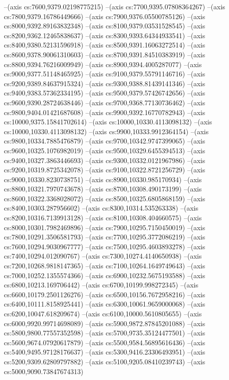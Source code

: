 --(axis cs:7600,9379.02198775215)
--(axis cs:7700,9395.07808364267)
--(axis cs:7800,9379.16786449666)
--(axis cs:7900,9376.05500785126)
--(axis cs:8000,9392.89163832348)
--(axis cs:8100,9379.03531528545)
--(axis cs:8200,9362.12465838637)
--(axis cs:8300,9393.64344933541)
--(axis cs:8400,9380.52131596918)
--(axis cs:8500,9391.16063272514)
--(axis cs:8600,9378.90061310603)
--(axis cs:8700,9391.84510383919)
--(axis cs:8800,9394.76216009949)
--(axis cs:8900,9394.4005287077)
--(axis cs:9000,9377.51148465925)
--(axis cs:9100,9379.55791146716)
--(axis cs:9200,9389.84637915324)
--(axis cs:9300,9388.81439141346)
--(axis cs:9400,9383.57362334195)
--(axis cs:9500,9379.57426742656)
--(axis cs:9600,9390.28724638446)
--(axis cs:9700,9368.77130736462)
--(axis cs:9800,9404.01421687608)
--(axis cs:9900,9392.16770782943)
--(axis cs:10000,9375.15841702614)
--(axis cs:10000,10330.4113098132)
--(axis cs:10000,10330.4113098132)
--(axis cs:9900,10333.9912364154)
--(axis cs:9800,10334.7885476879)
--(axis cs:9700,10342.9747399065)
--(axis cs:9600,10325.1076982019)
--(axis cs:9500,10329.6455394513)
--(axis cs:9400,10327.3863446693)
--(axis cs:9300,10332.0121967986)
--(axis cs:9200,10319.8725342078)
--(axis cs:9100,10322.8721256729)
--(axis cs:9000,10330.8230738751)
--(axis cs:8900,10330.985170934)
--(axis cs:8800,10321.7970743678)
--(axis cs:8700,10308.490173199)
--(axis cs:8600,10322.3368028072)
--(axis cs:8500,10325.6805868159)
--(axis cs:8400,10303.287956602)
--(axis cs:8300,10314.535263338)
--(axis cs:8200,10316.7139913128)
--(axis cs:8100,10308.404660575)
--(axis cs:8000,10301.7982469896)
--(axis cs:7900,10295.7150450019)
--(axis cs:7800,10291.3506581793)
--(axis cs:7700,10295.3772086219)
--(axis cs:7600,10294.9030967777)
--(axis cs:7500,10295.4603893278)
--(axis cs:7400,10294.012090767)
--(axis cs:7300,10274.4140650938)
--(axis cs:7200,10268.9818147365)
--(axis cs:7100,10264.1649749643)
--(axis cs:7000,10252.1355574366)
--(axis cs:6900,10232.5675193588)
--(axis cs:6800,10213.169706442)
--(axis cs:6700,10199.998272345)
--(axis cs:6600,10179.2501126276)
--(axis cs:6500,10156.7672958216)
--(axis cs:6400,10111.8158925441)
--(axis cs:6300,10061.9659000068)
--(axis cs:6200,10047.618209674)
--(axis cs:6100,10000.5610805655)
--(axis cs:6000,9920.99714698089)
--(axis cs:5900,9872.87845201088)
--(axis cs:5800,9800.77557352598)
--(axis cs:5700,9735.35124477501)
--(axis cs:5600,9674.07920617879)
--(axis cs:5500,9584.56895616436)
--(axis cs:5400,9495.97128176637)
--(axis cs:5300,9416.23306493951)
--(axis cs:5200,9309.62809797882)
--(axis cs:5100,9205.08410239743)
--(axis cs:5000,9090.73847674313)
